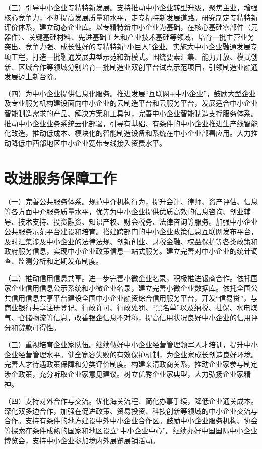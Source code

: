 （三）引导中小企业专精特新发展。支持推动中小企业转型升级，聚焦主业，增强核心竞争力，不断提高发展质量和水平，走专精特新发展道路。研究制定专精特新评价体系，建立动态企业库。以专精特新中小企业为基础，在核心基础零部件（元器件）、关键基础材料、先进基础工艺和产业技术基础等领域，培育一批主营业务突出、竞争力强、成长性好的专精特新“小巨人”企业。实施大中小企业融通发展专项工程，打造一批融通发展典型示范和新模式。围绕要素汇集、能力开放、模式创新、区域合作等领域分别培育一批制造业双创平台试点示范项目，引领制造业融通发展迈上新台阶。

（四）为中小企业提供信息化服务。推进发展“互联网+中小企业”，鼓励大型企业及专业服务机构建设面向中小企业的云制造平台和云服务平台，发展适合中小企业智能制造需求的产品、解决方案和工具包，完善中小企业智能制造支撑服务体系。推动中小企业业务系统云化部署，引导有基础、有条件的中小企业推进生产线智能化改造，推动低成本、模块化的智能制造设备和系统在中小企业部署应用。大力推动降低中西部地区中小企业宽带专线接入资费水平。

\section{改进服务保障工作}

（一）完善公共服务体系。规范中介机构行为，提升会计、律师、资产评估、信息等各方面中介服务质量水平，优先为中小企业提供优质高效的信息咨询、创业辅导、技术支持、投资融资、知识产权、财会税务、法律咨询等服务。加强中小企业公共服务示范平台建设和培育。搭建跨部门的中小企业政策信息互联网发布平台，及时汇集涉及中小企业的法律法规、创新创业、财税金融、权益保护等各类政策和政府服务信息，实现中小企业政策信息一站式服务。建立完善对中小企业的统计调查、监测分析和定期发布制度。

（二）推动信用信息共享。进一步完善小微企业名录，积极推进银商合作。依托国家企业信用信息公示系统和小微企业名录，建立完善小微企业数据库。依托全国公共信用信息共享平台建设全国中小企业融资综合信用服务平台，开发“信易贷”，与商业银行共享注册登记、行政许可、行政处罚、“黑名单”以及纳税、社保、水电煤气、仓储物流等信息，改善银企信息不对称，提高信用状况良好中小企业的信用评分和贷款可得性。

（三）重视培育企业家队伍。继续做好中小企业经营管理领军人才培训，提升中小企业经营管理水平。健全宽容失败的有效保护机制，为企业家成长创造良好环境。完善人才待遇政策保障和分类评价制度。构建亲清政商关系，推动企业家参与制定涉企政策，充分听取企业家意见建议。树立优秀企业家典型，大力弘扬企业家精神。

（四）支持对外合作与交流。优化海关流程、简化办事手续，降低企业通关成本。深化双多边合作，加强在促进政策、贸易投资、科技创新等领域的中小企业交流与合作。支持有条件的地方建设中外中小企业合作区。鼓励中小企业服务机构、协会等探索在条件成熟的国家和地区设立“中小企业中心”。继续办好中国国际中小企业博览会，支持中小企业参加境内外展览展销活动。

